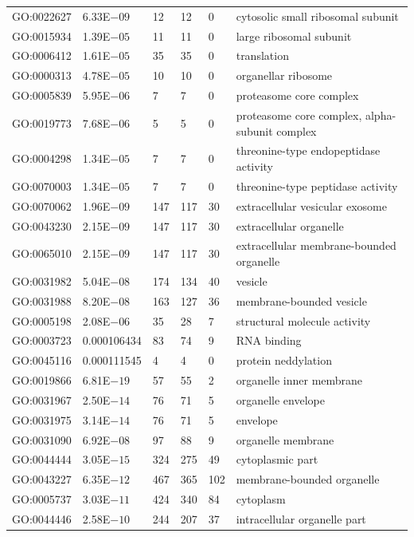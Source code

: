 \begin{longtable}{| p{} | p{} |p{} | p{} |p{} | p{} |}
		GO:0022627 & 6.33E$-09$ & 12 & 12 & 0 & cytosolic small ribosomal subunit \\ 
		GO:0015934 & 1.39E$-05$ & 11 & 11 & 0 & large ribosomal subunit \\ 
		GO:0006412 & 1.61E$-05$ & 35 & 35 & 0 & translation \\ 
		GO:0000313 & 4.78E$-05$ & 10 & 10 & 0 & organellar ribosome \\ 
		GO:0005839 & 5.95E$-06$ & 7 & 7 & 0 & proteasome core complex \\ 
		GO:0019773 & 7.68E$-06$ & 5 & 5 & 0 & proteasome core complex, alpha-subunit complex\\ 
		GO:0004298 & 1.34E$-05$ & 7 & 7 & 0 & threonine-type endopeptidase activity \\ 
		GO:0070003 & 1.34E$-05$ & 7 & 7 & 0 & threonine-type peptidase activity \\ 
		GO:0070062 & 1.96E$-09$ & 147 & 117 & 30 & extracellular vesicular exosome \\ 
		GO:0043230 & 2.15E$-09$ & 147 & 117 & 30 & extracellular organelle \\ 
		GO:0065010 & 2.15E$-09$ & 147 & 117 & 30 & extracellular membrane-bounded organelle \\ 
		GO:0031982 & 5.04E$-08$ & 174 & 134 & 40 & vesicle \\ 
		GO:0031988 & 8.20E$-08$ & 163 & 127 & 36 & membrane-bounded vesicle \\ 
		GO:0005198 & 2.08E$-06$ & 35 & 28 & 7 & structural molecule activity \\ 
		GO:0003723 & 0.000106434 & 83 & 74 & 9 & RNA binding \\ 
		GO:0045116 & 0.000111545 & 4 & 4 & 0 & protein neddylation \\ 
		GO:0019866 & 6.81E$-19$ & 57 & 55 & 2 & organelle inner membrane \\ 
		GO:0031967 & 2.50E$-14$ & 76 & 71 & 5 & organelle envelope \\ 
		GO:0031975 & 3.14E$-14$ & 76 & 71 & 5 & envelope \\ 
		GO:0031090 & 6.92E$-08$ & 97 & 88 & 9 & organelle membrane \\ 
		GO:0044444 & 3.05E$-15$ & 324 & 275 & 49 & cytoplasmic part \\ 
		GO:0043227 & 6.35E$-12$ & 467 & 365 & 102 & membrane-bounded organelle \\ 
		GO:0005737 & 3.03E$-11$ & 424 & 340 & 84 & cytoplasm \\ 
		GO:0044446 & 2.58E$-10$ & 244 & 207 & 37 & intracellular organelle part \\ 

\end{longtable}
